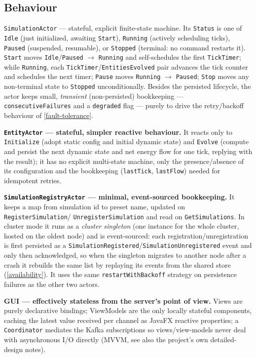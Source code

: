 \documentclass{scrreprt}
\begin{document}
\subsection{Behaviour}\label{behaviour}

\texttt{SimulationActor} --- stateful, explicit finite-state machine. Its
\texttt{Status} is one of \texttt{Idle} (just initialized, awaiting \texttt{Start}),
\texttt{Running} (actively scheduling ticks), \texttt{Paused} (suspended, resumable), or
\texttt{Stopped} (terminal: no command restarts it). \texttt{Start} moves
\texttt{Idle}/\texttt{Paused} $\rightarrow$ \texttt{Running} and self-schedules the first
\texttt{TickTimer}; while \texttt{Running}, each \texttt{TickTimer}/\texttt{EntitiesEvolved}
pair advances the tick counter and schedules the next timer; \texttt{Pause} moves
\texttt{Running} $\rightarrow$ \texttt{Paused}; \texttt{Stop} moves any non-terminal state to
\texttt{Stopped} unconditionally. Besides the persisted lifecycle, the actor keeps small,
\emph{transient} (non-persisted) bookkeeping --- \texttt{consecutiveFailures} and a
\texttt{degraded} flag --- purely to drive the retry/backoff behaviour of
\cref{fault-tolerance}.

\textbf{\texttt{EntityActor} --- stateful, simpler reactive behaviour.} It reacts only to
\texttt{Initialize} (adopt static config and initial dynamic state) and \texttt{Evolve}
(compute and persist the next dynamic state and net energy flow for one tick, replying with
the result); it has no explicit multi-state machine, only the presence/absence of its
configuration and the bookkeeping (\texttt{lastTick}, \texttt{lastFlow}) needed for
idempotent retries.

\textbf{\texttt{SimulationRegistryActor} --- minimal, event-sourced bookkeeping.} It keeps a
map from simulation id to preset name, updated on \texttt{RegisterSimulation}/
\texttt{UnregisterSimulation} and read on \texttt{GetSimulations}. In cluster mode it runs as a
\emph{cluster singleton} (one instance for the whole cluster, hosted on the oldest node) and is
event-sourced: each registration/unregistration is first persisted as a
\texttt{SimulationRegistered}/\texttt{SimulationUnregistered} event and only then acknowledged,
so when the singleton migrates to another node after a crash it rebuilds the same list by
replaying its events from the shared store (\cref{availability}). It uses the same
\texttt{restartWithBackoff} strategy on persistence failures as the other two actors.

\textbf{GUI --- effectively stateless from the server's point of view.} Views are purely
declarative bindings; ViewModels are the only locally stateful components, caching the latest
value received per channel as JavaFX reactive properties; a \texttt{Coordinator} mediates the
Kafka subscriptions so views/view-models never deal with asynchronous I/O directly (MVVM, see
also the project's own detailed-design notes).
\end{document}

